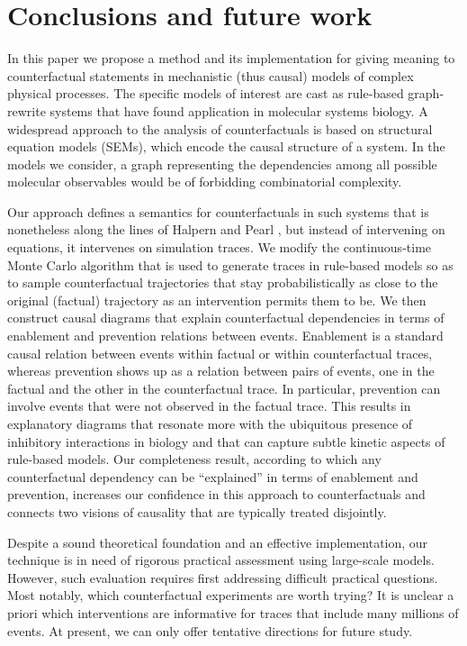 
\section*{Conclusions and future work}

In this paper we propose a method and its implementation for giving meaning to
counterfactual statements in mechanistic (thus causal) models of complex
physical processes. The specific models of interest are cast as rule-based
graph-rewrite systems that have found application in molecular systems biology.
A widespread approach to the analysis of counterfactuals is based on structural
equation models (SEMs), which encode the causal structure of a system. In the
models we consider, a graph representing the dependencies among all possible
molecular observables would be of forbidding combinatorial complexity.

Our approach defines a semantics for counterfactuals in such systems that is
nonetheless along the lines of Halpern and Pearl
\cite{pearl2009causality,halpern2016actual}, but instead of intervening on
equations, it intervenes on simulation traces. We modify the continuous-time
Monte Carlo algorithm that is used to generate traces in rule-based models so as
to sample counterfactual trajectories that stay probabilistically as close to
the original (factual) trajectory as an intervention permits them to be. We then
construct causal diagrams that explain counterfactual dependencies in terms of
enablement and prevention relations between events. Enablement is a standard
causal relation between events within factual or within counterfactual traces,
whereas prevention shows up as a relation between pairs of events, one in the
factual and the other in the counterfactual trace. In particular, prevention can
involve events that were not observed in the factual trace. This results in
explanatory diagrams that resonate more with the ubiquitous presence of
inhibitory interactions in biology and that can capture subtle kinetic aspects
of rule-based models.  Our completeness result, according to which any
counterfactual dependency can be ``explained'' in terms of enablement and
prevention, increases our confidence in this approach to counterfactuals and
connects two visions of causality that are typically treated
disjointly.

Despite a sound theoretical foundation and an effective implementation, our technique is in need of rigorous practical assessment using large-scale
models. However, such evaluation requires first addressing difficult practical
questions. Most notably, which counterfactual experiments are worth trying? It
is unclear a priori which interventions are informative for traces that
include many millions of events. At present, we can only offer tentative
directions for future study.

